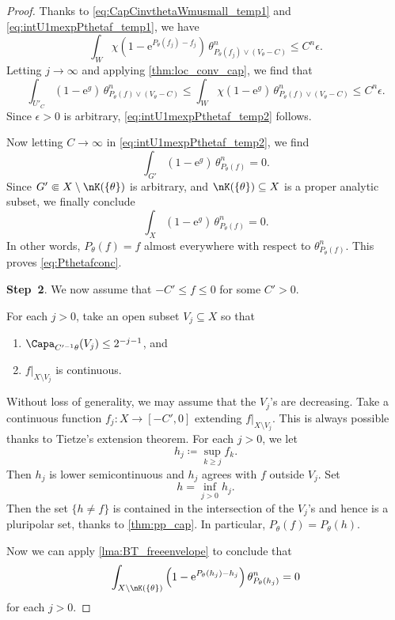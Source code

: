 \begin{proof}
    Thanks to \eqref{eq:CapCinvthetaWmusmall_temp1} and \eqref{eq:intU1mexpPthetaf_temp1}, we have
    \[
    \int_W \chi\left( 1-\mathrm{e}^{P_{\theta}(f_j)-f_j} \right)\,\theta_{P_{\theta}(f_j)\lor (V_{\theta}-C)}^n\leq C^n\epsilon.
    \]
    Letting $j\to\infty$ and applying \cref{thm:loc_conv_cap}, we find that
    \[
    \int_{U'_C} \left( 1-\mathrm{e}^{g} \right)\,\theta_{P_{\theta}(f)\lor (V_{\theta}-C)}^n\leq \int_W \chi\left( 1-\mathrm{e}^{g} \right)\,\theta_{P_{\theta}(f)\lor (V_{\theta}-C)}^n\leq C^n\epsilon.
    \]
    Since $\epsilon>0$ is arbitrary, \eqref{eq:intU1mexpPthetaf_temp2} follows.

    Now letting $C\to\infty$ in \eqref{eq:intU1mexpPthetaf_temp2}, we find
    \[
    \int_{G'}\left( 1-\mathrm{e}^{g} \right)\,\theta_{P_{\theta}(f)}^n=0.
    \]
    Since $G'\Subset X\setminus \nK(\{\theta\})$ is arbitrary, and $\nK(\{\theta\})\subseteq X$ is a proper analytic subset, we finally conclude
    \[
    \int_X \left( 1-\mathrm{e}^{g} \right)\,\theta_{P_{\theta}(f)}^n=0.
    \]
    In other words, $P_{\theta}(f)=f$ almost everywhere with respect to $\theta_{P_{\theta}(f)}^n$. This proves \eqref{eq:Pthetafconc}.

    \textbf{Step~2}. We now assume that $-C'\leq f\leq 0$ for some $C'>0$.

    For each $j>0$, take an open subset $V_j\subseteq X$ so that
    \begin{enumerate}
        \item\label{itm:chapter-npp:L662:1} $\Capa_{C'^{-1}\theta}(V_j)\leq 2^{-j-1}$, and
        \item\label{itm:chapter-npp:L662:2} $f|_{X\setminus V_j}$ is continuous.
    \end{enumerate}
    Without loss of generality, we may assume that the $V_j$'s are decreasing. Take a continuous function $f_j\colon X\rightarrow [-C',0]$ extending $f|_{X\setminus V_j}$. This is always possible thanks to Tietze's extension theorem. For each $j>0$, we let
    \[
    h_j\coloneqq \sup_{k\geq j} f_k.
    \]
    Then $h_j$ is lower semicontinuous and $h_j$ agrees with $f$ outside $V_j$.
    Set
    \[
    h=\inf_{j>0} h_j.
    \]
    Then the set $\{h\neq f\}$ is contained in the intersection of the $V_j$'s and hence is a pluripolar set, thanks to \cref{thm:pp_cap}. In particular, $P_{\theta}(f)=P_{\theta}(h)$.

    Now we can apply \cref{lma:BT_freeenvelope} to conclude that
    \[
    \int_{X\setminus \nK(\{\theta\})} \left(1-\mathrm{e}^{P_{\theta}(h_j)-h_j} \right) \theta_{P_{\theta}(h_j)}^n=0
    \]
    for each $j>0$.


\end{proof}
